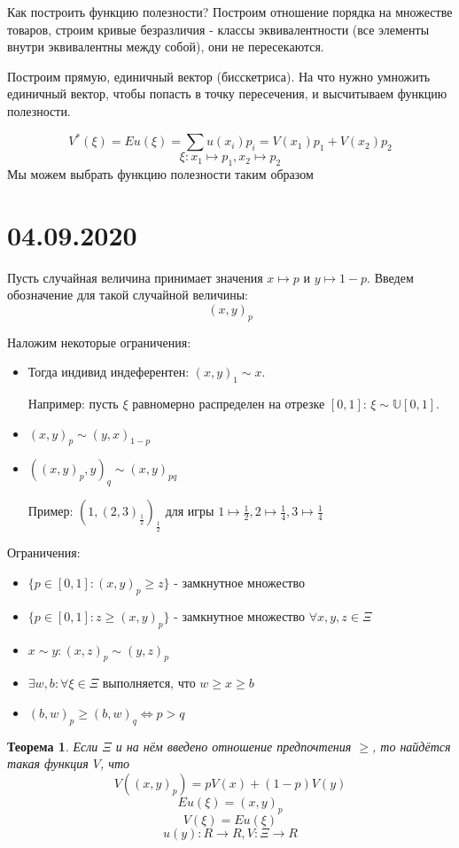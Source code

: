 \documentclass[aps,%
12pt,%
final,%
oneside,
onecolumn,%
musixtex, %
superscriptaddress,%
centertags]{article} %
\theoremstyle{plain}
\newtheorem{theorem}{Теорема}[section] %
\theoremstyle{definition}
\theoremstyle{remark}
\begin{document}
Как построить функцию полезности? Построим отношение порядка на множестве товаров, строим кривые безразличия - классы эквивалентности (все элементы внутри эквивалентны между собой), они не пересекаются.

Построим прямую, единичный вектор (бисскетриса). На что нужно умножить единичный вектор, чтобы попасть в точку пересечения, и высчитываем функцию полезности.

$$V^*(\xi) = Eu(\xi) = \sum\limits u(x_i)p_i = V(x_1)p_1+V(x_2)p_2$$
$$\xi: x_1 \mapsto p_1,  x_2 \mapsto p_2$$
Мы можем выбрать функцию полезности таким образом

\section{04.09.2020}

Пусть случайная величина принимает значения $x \mapsto p$ и $y \mapsto 1-p$. Введем обозначение для такой случайной величины:
$$(x,y)_p$$

Наложим некоторые ограничения:
\begin{itemize}
	\item Тогда индивид индеферентен: $(x,y)_1 \sim x$.

	Например: пусть $\xi$ равномерно распределен на отрезке $[0,1]$: $\xi \sim \mathbb{U}[0,1]$.
	\item $(x,y)_p \sim (y,x)_{1-p}$
	\item $((x,y)_p,y)_q \sim (x,y)_{pq}$

	Пример: $(1,(2,3)_{\frac{1}{2}})_{\frac{1}{2}}$ для игры $1 \mapsto \frac{1}{2},2 \mapsto \frac{1}{4},3 \mapsto \frac{1}{4}$
\end{itemize}

Ограничения:
\begin{itemize}
	\item $\{p \in [0,1]: (x,y)_p \geq z\}$ - замкнутное множество
	\item $\{p \in [0,1]: z \geq (x,y)_p \}$ - замкнутное множество $\forall x,y,z \in \Xi$
	\item $x \sim y: (x,z)_p \sim (y,z)_p$
	\item $\exists w,b: \forall \xi \in \Xi$ выполняется, что $w \geq x \geq b$
	\item $(b,w)_p \geq (b,w)_q \Leftrightarrow p > q$
\end{itemize}

\begin{theorem}
	Если $\Xi$ и на нём введено отношение предпочтения $\geq$, то найдётся такая функция $V$, что $$V((x,y)_p) = pV(x)+(1-p)V(y)$$
	$$Eu(\xi) = (x,y)_p$$
	$$V(\xi) = Eu(\xi)$$
	$$u(y): R \to R, V: \Xi \to R$$
\end{theorem}
\end{document}

